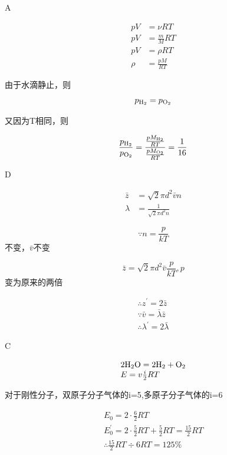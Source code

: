 A

\solve

$$
\begin{aligned} 
p V & = \nu R T \\ p V & = \frac { m } { M } R T \\
p V & = \rho R T \\
\rho & = \frac { p M } { R T }
\end{aligned}
$$

由于水滴静止，则
$$
p_{\ce{H2}} =p_{\ce{O2}}
$$

又因为T相同，则

$$
\frac { p _ {\ce{H2}} } { p _ {\ce{O2}} } = \frac { \frac { p M _ {\ce{H2}} } { R T } } { \frac { p M_{\ce{O2}}}{ R T}}=\frac{1}{16}
$$

D

\solve

$$
\begin{aligned}
 \bar { z } & = \sqrt { 2 } \pi d ^ { 2 } \bar { v } n \\ \lambda & = \frac { 1 } { \sqrt { 2 } \pi d ^ { 2 } n } 
\end{aligned}
$$

$$
\because n = \frac { p } { k T }
$$不变，$ \bar { v }$不变

$$
\bar { z } = \sqrt { 2 } \pi d ^ { 2 } \bar { v } \frac { p } { k T },p
$$变为原来的两倍

$$
\begin{array} { l } 
{ \therefore z ^ { \prime } = 2 \bar { z } } \\ 
{ \because \bar { v } = \bar { \lambda } \bar { z } } \\
 { \therefore \lambda ^ { \prime } = 2 \bar { \lambda } }
\end{array}
$$

C

\solve

$$
\begin{array} { l } 
{ 2\ce{H2O} = 2\ce{H2}+\ce{O2}}\\
{ E = v\frac{i}{2}RT} 
\end{array}
$$

对于刚性分子，双原子分子气体的i=5,多原子分子气体的i=6

$$
\begin{array} { l }
 E _ { 0 } = 2 \cdot \frac { 6 } { 2 } R T \\ E _ { 0 } ^ { \prime } = 2 \cdot \frac { 5 } { 2 } R T + \frac { 5 } { 2 } R T = \frac { 15 } { 2 } R T \\ \therefore \frac { 15 } { 2 } R T \div 6 R T = 125 \% 
\end{array}
$$

